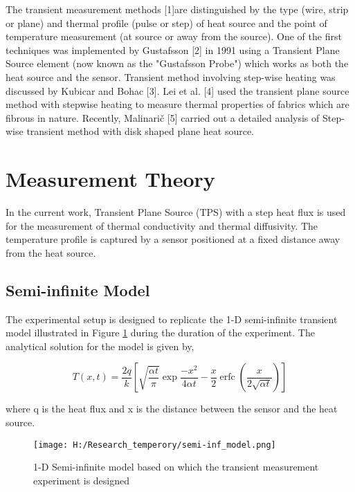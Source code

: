 \documentclass[12pt]{report}
\DeclareMathOperator{\erfc}{erfc}
\begin{document}
The transient measurement methods [1]are distinguished by the type (wire, strip or plane) and thermal profile (pulse or step) of heat source and the point of temperature measurement (at source or away from the source). One of the first techniques was implemented by Gustafsson [2] in 1991 using a Transient Plane Source element (now known as the "Gustafsson Probe") which works as both the heat source and the sensor. Transient method involving step-wise heating was discussed by Kubicar and Bohac [3].  Lei et al. [4] used the transient plane source method with stepwise heating to measure thermal properties of fabrics which are fibrous in nature. Recently, Malinarič [5] carried out a detailed analysis of Step-wise transient method with disk shaped plane heat source. 

\section*{Measurement Theory}

In the current work, Transient Plane Source (TPS) with a step heat flux is used for the measurement of thermal conductivity and thermal diffusivity. The temperature profile is captured by a sensor positioned at a fixed distance away from the heat source. 

\subsection*{Semi-infinite Model}

The experimental setup is designed to replicate the 1-D semi-infinite transient model illustrated in Figure \ref{pic:model} during the duration of the experiment. The analytical solution for the model is given by,

\begin{equation}
T(x,t) = \frac{2q}{k}\left[ \sqrt{\frac{\alpha t}{\pi}}\exp{\frac{-x^{2}}{4 \alpha t}} - \frac{x}{2}\erfc{(\frac{x}{2 \sqrt{\alpha t}})}\right]
\end{equation}

where q is the heat flux and x is the distance between the sensor and the heat source. 

\begin{figure}[H]
\centering
\texttt{[image: H:/Research\_temperory/semi-inf\_model.png]}
\caption{1-D Semi-infinite model based on which the transient measurement experiment is designed}
\label{pic:model}
\end{figure}
\end{document}
